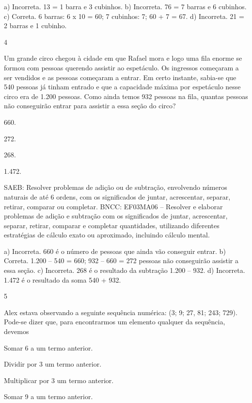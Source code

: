 \begin{multicols}{2}
\begin{enumerate}
{a) Incorreta. 13 = 1 barra e 3 cubinhos.
b) Incorreta. 76 = 7 barras e 6 cubinhos.
c) Correta. 6 barras: 6 x 10 = 60; 7 cubinhos: 7; 60 + 7 = 67.
d) Incorreta. 21 = 2 barras e 1 cubinho.

\num{4}

Um grande circo chegou à cidade em que Rafael mora e logo uma fila enorme se formou com pessoas querendo assistir ao espetáculo. Os ingressos começaram a ser vendidos e as pessoas começaram a entrar. Em certo instante, sabia-se que 540 pessoas já tinham entrado e que a capacidade máxima por espetáculo nesse circo era de 1.200 pessoas. Como ainda temos 932 pessoas na fila, quantas pessoas não conseguirão entrar para assistir a essa seção do circo?

\begin{escolha}
\item
  660.
\item
  272.
\item
  268.
\item
  1.472.
\end{escolha}

SAEB: Resolver problemas de adição ou de subtração,
envolvendo números naturais de até 6 ordens, com os significados de
juntar, acrescentar, separar, retirar, comparar ou completar.
BNCC: EF03MA06 – Resolver e elaborar problemas de adição e subtração com os significados de
juntar, acrescentar, separar, retirar, comparar e completar quantidades, utilizando diferentes
estratégias de cálculo exato ou aproximado, incluindo cálculo mental.


a) Incorreta. 660 é o número de pessoas que ainda vão conseguir entrar.
b) Correta. 1.200 -- 540 = 660; 932 -- 660 = 272 pessoas não conseguirão assistir a essa seção.
c) Incorreta. 268 é o resultado da subtração 1.200 -- 932.
d) Incorreta. 1.472 é o resultado da soma 540 + 932.

\num{5}

Alex estava observando a seguinte sequência numérica: (3; 9; 27, 81; 243; 729).
Pode-se dizer que, para encontrarmos um elemento qualquer da sequência, devemos 

\begin{escolha}
\item
  Somar 6 a um termo anterior.
\item
  Dividir por 3 um termo anterior.
\item
  Multiplicar por 3 um termo anterior.
\item
  Somar 9 a um termo anterior.
\end{escolha}

}
\end{enumerate}
\end{multicols}
